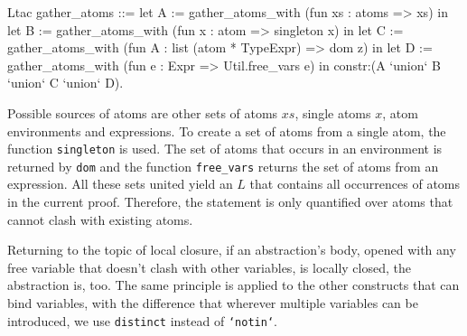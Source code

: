 \documentclass[a4paper, 11pt, fleqn]{scrreprt}
\newcommand{\coqinline}[1]{\texttt{#1}}
\begin{document}
	\begin{coqcode}
Ltac gather_atoms ::=
  let A := gather_atoms_with (fun xs : atoms => xs) in
  let B := gather_atoms_with (fun x : atom => singleton x) in
  let C := gather_atoms_with (fun A : list (atom * TypeExpr) => dom z) in
  let D := gather_atoms_with (fun e : Expr => Util.free_vars e) in
  constr:(A `union` B `union` C `union` D).
	\end{coqcode}
	Possible sources of atoms are other sets of atoms $xs$, single atoms $x$, atom environments and expressions. To create a set of atoms from a single atom, the function \coqinline{singleton} is used. The set of atoms that occurs in an environment is returned by \coqinline{dom} and the function \coqinline{free_vars} returns the set of atoms from an expression. All these sets united yield an $L$ that contains all occurrences of atoms in the current proof. Therefore, the statement is only quantified over atoms that cannot clash with existing atoms.
	\par
	Returning to the topic of local closure, if an abstraction's body, opened with any free variable that doesn't clash with other variables, is locally closed, the abstraction is, too. The same principle is applied to the other constructs that can bind variables, with the difference that wherever multiple variables can be introduced, we use \coqinline{distinct} instead of \coqinline{`notin`}.
	
\end{document}
